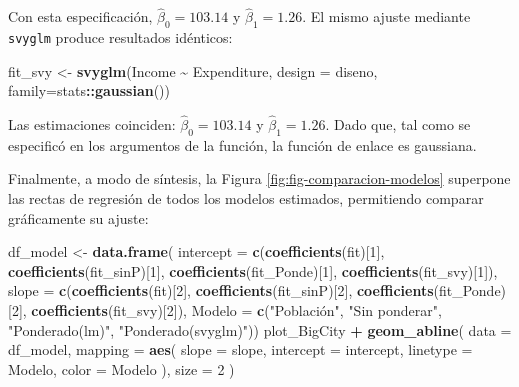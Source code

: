 \documentclass[
  spanish,
  12pt,
]{book}
\newenvironment{Shaded}{\begin{snugshade}}{\end{snugshade}}
\newcommand{\AttributeTok}[1]{\textcolor[rgb]{0.13,0.29,0.53}{#1}}
\newcommand{\DecValTok}[1]{\textcolor[rgb]{0.00,0.00,0.81}{#1}}
\newcommand{\FunctionTok}[1]{\textcolor[rgb]{0.13,0.29,0.53}{\textbf{#1}}}
\newcommand{\NormalTok}[1]{#1}
\newcommand{\OtherTok}[1]{\textcolor[rgb]{0.56,0.35,0.01}{#1}}
\newcommand{\SpecialCharTok}[1]{\textcolor[rgb]{0.81,0.36,0.00}{\textbf{#1}}}
\newcommand{\StringTok}[1]{\textcolor[rgb]{0.31,0.60,0.02}{#1}}
\begin{document}
Con esta especificación, \(\hat{\beta}_{0} = 103.14\) y \(\hat{\beta}_{1}=1.26\). El mismo ajuste mediante \texttt{svyglm} produce resultados idénticos:

\begin{Shaded}
\begin{Highlighting}[]
\NormalTok{fit\_svy }\OtherTok{\textless{}{-}} \FunctionTok{svyglm}\NormalTok{(Income }\SpecialCharTok{\textasciitilde{}}\NormalTok{ Expenditure,}
                  \AttributeTok{design =}\NormalTok{ diseno, }\AttributeTok{family=}\NormalTok{stats}\SpecialCharTok{::}\FunctionTok{gaussian}\NormalTok{())}
\end{Highlighting}
\end{Shaded}

Las estimaciones coinciden: \(\hat{\beta}_{0} = 103.14\) y \(\hat{\beta}_{1} = 1.26\). Dado que, tal como se especificó en los argumentos de la función, la función de enlace es gaussiana.

Finalmente, a modo de síntesis, la Figura \ref{fig:fig-comparacion-modelos} superpone las rectas de regresión de todos los modelos estimados, permitiendo comparar gráficamente su ajuste:

\begin{Shaded}
\begin{Highlighting}[]
\NormalTok{df\_model }\OtherTok{\textless{}{-}} \FunctionTok{data.frame}\NormalTok{(}
  \AttributeTok{intercept =} \FunctionTok{c}\NormalTok{(}\FunctionTok{coefficients}\NormalTok{(fit)[}\DecValTok{1}\NormalTok{],}
               \FunctionTok{coefficients}\NormalTok{(fit\_sinP)[}\DecValTok{1}\NormalTok{],}
               \FunctionTok{coefficients}\NormalTok{(fit\_Ponde)[}\DecValTok{1}\NormalTok{],}
               \FunctionTok{coefficients}\NormalTok{(fit\_svy)[}\DecValTok{1}\NormalTok{]),}
  \AttributeTok{slope =} \FunctionTok{c}\NormalTok{(}\FunctionTok{coefficients}\NormalTok{(fit)[}\DecValTok{2}\NormalTok{],}
               \FunctionTok{coefficients}\NormalTok{(fit\_sinP)[}\DecValTok{2}\NormalTok{],}
               \FunctionTok{coefficients}\NormalTok{(fit\_Ponde)[}\DecValTok{2}\NormalTok{],}
               \FunctionTok{coefficients}\NormalTok{(fit\_svy)[}\DecValTok{2}\NormalTok{]),}
  \AttributeTok{Modelo =} \FunctionTok{c}\NormalTok{(}\StringTok{"Población"}\NormalTok{, }\StringTok{"Sin ponderar"}\NormalTok{,}
             \StringTok{"Ponderado(lm)"}\NormalTok{, }\StringTok{"Ponderado(svyglm)"}\NormalTok{))}
\NormalTok{plot\_BigCity }\SpecialCharTok{+}  \FunctionTok{geom\_abline}\NormalTok{( }\AttributeTok{data =}\NormalTok{ df\_model,}
    \AttributeTok{mapping =} \FunctionTok{aes}\NormalTok{( }\AttributeTok{slope =}\NormalTok{ slope,}
      \AttributeTok{intercept =}\NormalTok{ intercept, }\AttributeTok{linetype =}\NormalTok{ Modelo,}
      \AttributeTok{color =}\NormalTok{ Modelo ), }\AttributeTok{size =} \DecValTok{2}
\NormalTok{  )}
\end{Highlighting}
\end{Shaded}
\end{document}
